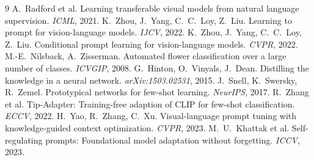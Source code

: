 \documentclass[10pt,twocolumn,a4paper]{article}
\begin{document}
{\footnotesize
\begin{thebibliography}{9}
\setlength{\itemsep}{1pt}
 A.~Radford et al. Learning transferable visual models from natural language
  supervision. \emph{ICML}, 2021.
 K.~Zhou, J.~Yang, C.~C.~Loy, Z.~Liu. Learning to prompt for vision-language
  models. \emph{IJCV}, 2022.
 K.~Zhou, J.~Yang, C.~C.~Loy, Z.~Liu. Conditional prompt learning for
  vision-language models. \emph{CVPR}, 2022.
 M.-E.~Nilsback, A.~Zisserman. Automated flower classification over a
  large number of classes. \emph{ICVGIP}, 2008.
 G.~Hinton, O.~Vinyals, J.~Dean. Distilling the knowledge in a neural network.
  \emph{arXiv:1503.02531}, 2015.
 J.~Snell, K.~Swersky, R.~Zemel. Prototypical networks for few-shot
  learning. \emph{NeurIPS}, 2017.
 R.~Zhang et al. Tip-Adapter: Training-free adaption of CLIP for
  few-shot classification. \emph{ECCV}, 2022.
 H.~Yao, R.~Zhang, C.~Xu. Visual-language prompt tuning with
  knowledge-guided context optimization. \emph{CVPR}, 2023.
 M.~U.~Khattak et al. Self-regulating prompts: Foundational model
  adaptation without forgetting. \emph{ICCV}, 2023.
\end{thebibliography}
}
\end{document}
